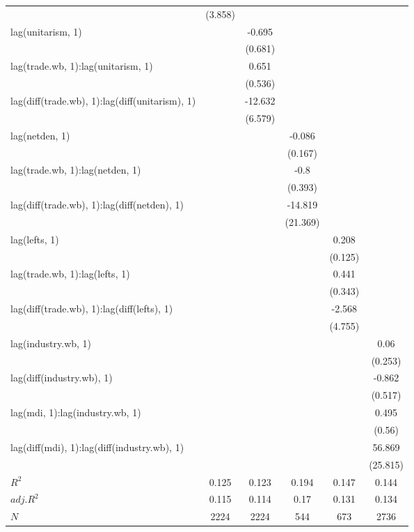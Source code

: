 \begin{table}[htbp]
\begin{tabular}{l*{5}{c}}
  		&(3.858) 		& 		& 		& 		& \\
lag(unitarism, 1) 		& 		&-0.695 		& 		& 		& \\
  		& 		&(0.681) 		& 		& 		& \\
lag(trade.wb, 1):lag(unitarism, 1) 		& 		&0.651 		& 		& 		& \\
  		& 		&(0.536) 		& 		& 		& \\
lag(diff(trade.wb), 1):lag(diff(unitarism), 1) 		& 		&-12.632\sym{*} 		& 		& 		& \\
  		& 		&(6.579) 		& 		& 		& \\
lag(netden, 1) 		& 		& 		&-0.086 		& 		& \\
  		& 		& 		&(0.167) 		& 		& \\
lag(trade.wb, 1):lag(netden, 1) 		& 		& 		&-0.8\sym{**} 		& 		& \\
  		& 		& 		&(0.393) 		& 		& \\
lag(diff(trade.wb), 1):lag(diff(netden), 1) 		& 		& 		&-14.819 		& 		& \\
  		& 		& 		&(21.369) 		& 		& \\
lag(lefts, 1) 		& 		& 		& 		&0.208\sym{*} 		& \\
  		& 		& 		& 		&(0.125) 		& \\
lag(trade.wb, 1):lag(lefts, 1) 		& 		& 		& 		&0.441 		& \\
  		& 		& 		& 		&(0.343) 		& \\
lag(diff(trade.wb), 1):lag(diff(lefts), 1) 		& 		& 		& 		&-2.568 		& \\
  		& 		& 		& 		&(4.755) 		& \\
lag(industry.wb, 1) 		& 		& 		& 		& 		&0.06 \\
  		& 		& 		& 		& 		&(0.253) \\
lag(diff(industry.wb), 1) 		& 		& 		& 		& 		&-0.862\sym{*} \\
  		& 		& 		& 		& 		&(0.517) \\
lag(mdi, 1):lag(industry.wb, 1) 		& 		& 		& 		& 		&0.495 \\
  		& 		& 		& 		& 		&(0.56) \\
lag(diff(mdi), 1):lag(diff(industry.wb), 1) 		& 		& 		& 		& 		&56.869\sym{**} \\
  		& 		& 		& 		& 		&(25.815) \\
\hline
$R^2$ 		&0.125 		&0.123 		&0.194 		&0.147 		&0.144 \\
$adj.R^2$ 		&0.115 		&0.114 		&0.17 		&0.131 		&0.134 \\
$N$ 		&\multicolumn{1}{c}{2224} 		&\multicolumn{1}{c}{2224} 		&\multicolumn{1}{c}{544} 		&\multicolumn{1}{c}{673} 		&\multicolumn{1}{c}{2736} \\

\end{tabular}
\end{table}
